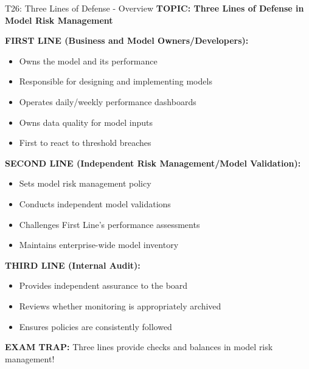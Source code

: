 \documentclass[8pt]{beamer}
\begin{document}
	
	\begin{frame}{T26: Three Lines of Defense - Overview}
		\fontsize{6.5}{7.5}\selectfont
		\textbf{TOPIC: Three Lines of Defense in Model Risk Management}
		
		\vspace{0.1cm}
		\textbf{FIRST LINE (Business and Model Owners/Developers):}
		\begin{itemize}
			\item Owns the model and its performance
			\item Responsible for designing and implementing models
			\item Operates daily/weekly performance dashboards
			\item Owns data quality for model inputs
			\item First to react to threshold breaches
		\end{itemize}
		
		\vspace{0.1cm}
		\textbf{SECOND LINE (Independent Risk Management/Model Validation):}
		\begin{itemize}
			\item Sets model risk management policy
			\item Conducts independent model validations
			\item Challenges First Line's performance assessments
			\item Maintains enterprise-wide model inventory
		\end{itemize}
		
		\vspace{0.1cm}
		\textbf{THIRD LINE (Internal Audit):}
		\begin{itemize}
			\item Provides independent assurance to the board
			\item Reviews whether monitoring is appropriately archived
			\item Ensures policies are consistently followed
		\end{itemize}
		
		\textcolor{myred}{\textbf{EXAM TRAP:}} Three lines provide \textcolor{myblue}{checks and balances in model risk management}!
	\end{frame}
	
\end{document}
